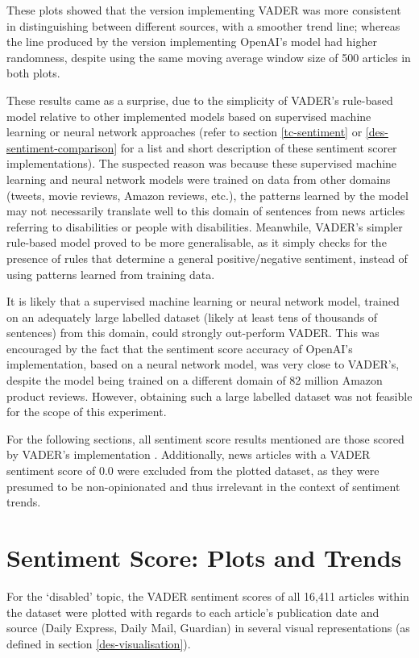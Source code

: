 \documentclass{report}
\begin{document}
These plots showed that the version implementing VADER was more consistent in distinguishing between different sources, with a smoother trend line; 
whereas the line produced by the version implementing OpenAI's model had higher randomness, despite using the same moving average window size of 500 articles in both plots.

These results came as a surprise, due to the simplicity of VADER's rule-based model relative to other implemented models based on supervised machine learning or neural network approaches (refer to section \ref{tc-sentiment} or \ref{des-sentiment-comparison} for a list and short description of these sentiment scorer implementations).
The suspected reason was because these supervised machine learning and neural network models were trained on data from other domains (tweets, movie reviews, Amazon reviews, etc.), the patterns learned by the model may not necessarily translate well to this domain of sentences from news articles referring to disabilities or people with disabilities. 
Meanwhile, VADER's simpler rule-based model proved to be more generalisable, as it simply checks for the presence of rules that determine a general positive/negative sentiment, instead of using patterns learned from training data.

It is likely that a supervised machine learning or neural network model, trained on an adequately large labelled dataset (likely at least tens of thousands of sentences) from this domain, could strongly out-perform VADER. 
This was encouraged by the fact that the sentiment score accuracy of OpenAI's implementation, based on a neural network model, was very close to VADER's, despite the model being trained on a different domain of 82 million Amazon product reviews. 
However, obtaining such a large labelled dataset was not feasible for the scope of this experiment.

For the following sections, all sentiment score results mentioned are those scored by VADER's implementation \cite{VADER}.
Additionally, news articles with a VADER sentiment score of 0.0 were excluded from the plotted dataset, as they were presumed to be non-opinionated and thus irrelevant in the context of sentiment trends.

\section{Sentiment Score: Plots and Trends} \label{Sentiment score: plots and trends}
For the `disabled' topic, the VADER sentiment scores of all 16,411 articles within the dataset were plotted with regards to each article's publication date and source (Daily Express, Daily Mail, Guardian) in several visual representations (as defined in section \ref{des-visualisation}).
\end{document}
